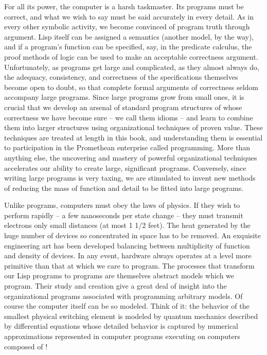 For all its power, the computer is a harsh taskmaster.
Its programs must be correct, and what we wish to say must be said accurately in every detail.
As in every other symbolic activity, we become convinced of program truth through argument.
Lisp itself can be assigned a semantics (another model, by the way),
and if a program's function can be specified, say, in the predicate calculus,
the proof methods of logic can be used to make an acceptable correctness argument.
Unfortunately, as programs get large and complicated, as they almost always do,
the adequacy, consistency, and correctness of the specifications themselves become open to doubt,
so that complete formal arguments of correctness seldom accompany large programs.
Since large programs grow from small ones, it is crucial that
we develop an arsenal of standard program structures of whose correctness we have become sure
-- we call them idioms --
and learn to combine them into larger structures using organizational techniques of proven value.
These techniques are treated at length in this book,
and understanding them is essential to participation in the Promethean enterprise called programming.
More than anything else, the uncovering and mastery of powerful organizational techniques accelerates
our ability to create large, significant programs.
Conversely, since writing large programs is very taxing,
we are stimulated to invent new methods of reducing the mass of function and detail to be fitted into large programs.

Unlike programs, computers must obey the laws of physics.
If they wish to perform rapidly -- a few nanoseconds per state change -- they must
transmit electrons only small distances (at most 1 1/2 feet).
The heat generated by the huge number of devices so concentrated in space has to be removed.
An exquisite engineering art has been developed balancing between multiplicity of function and density of devices.
In any event, hardware always operates at a level more primitive than that at which we care to program.
The processes that transform our Lisp programs to  programs
are themselves abstract models which we program.
Their study and creation give a great deal of insight into
the organizational programs associated with programming arbitrary models.
Of course the computer itself can be so modeled.
Think of it:
the behavior of the smallest physical switching element is modeled by quantum mechanics described by
differential equations whose detailed behavior is captured by
numerical approximations represented in computer programs executing on computers composed of \unknown!

